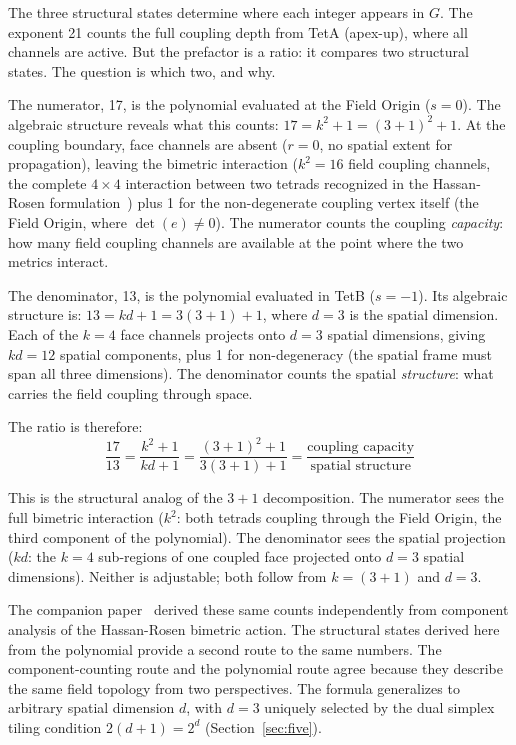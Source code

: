 \documentclass[aps,prd,preprint,superscriptaddress,showpacs,preprintnumbers,amsmath,amssymb,nofootinbib]{revtex4-2}
\begin{document}
The three structural states determine where each integer appears in $G$. The exponent 21 counts the full coupling depth from TetA (apex-up), where all channels are active. But the prefactor is a ratio: it compares two structural states. The question is which two, and why.

The numerator, 17, is the polynomial evaluated at the Field Origin ($s = 0$). The algebraic structure reveals what this counts: $17 = k^2 + 1 = (3{+}1)^2 + 1$. At the coupling boundary, face channels are absent ($r = 0$, no spatial extent for propagation), leaving the bimetric interaction ($k^2 = 16$ field coupling channels, the complete $4 \times 4$ interaction between two tetrads recognized in the Hassan-Rosen formulation~\cite{hassan2012}) plus 1 for the non-degenerate coupling vertex itself (the Field Origin, where $\det(e) \neq 0$). The numerator counts the coupling \emph{capacity}: how many field coupling channels are available at the point where the two metrics interact.

The denominator, 13, is the polynomial evaluated in TetB ($s = -1$). Its algebraic structure is: $13 = kd + 1 = 3(3{+}1) + 1$, where $d = 3$ is the spatial dimension. Each of the $k = 4$ face channels projects onto $d = 3$ spatial dimensions, giving $kd = 12$ spatial components, plus 1 for non-degeneracy (the spatial frame must span all three dimensions). The denominator counts the spatial \emph{structure}: what carries the field coupling through space.

The ratio is therefore:
\begin{equation}
\frac{17}{13} = \frac{k^2 + 1}{kd + 1} = \frac{(3+1)^2 + 1}{3(3+1) + 1} = \frac{\text{coupling capacity}}{\text{spatial structure}}
\label{eq:prefactor}
\end{equation}

This is the structural analog of the $3+1$ decomposition. The numerator sees the full bimetric interaction ($k^2$: both tetrads coupling through the Field Origin, the third component of the polynomial). The denominator sees the spatial projection ($kd$: the $k = 4$ sub-regions of one coupled face projected onto $d = 3$ spatial dimensions). Neither is adjustable; both follow from $k = (3{+}1)$ and $d = 3$.

The companion paper~\cite{paper6} derived these same counts independently from component analysis of the Hassan-Rosen bimetric action. The structural states derived here from the polynomial provide a second route to the same numbers. The component-counting route and the polynomial route agree because they describe the same field topology from two perspectives. The formula generalizes to arbitrary spatial dimension $d$, with $d = 3$ uniquely selected by the dual simplex tiling condition $2(d+1) = 2^d$ (Section~\ref{sec:five}).
\end{document}
